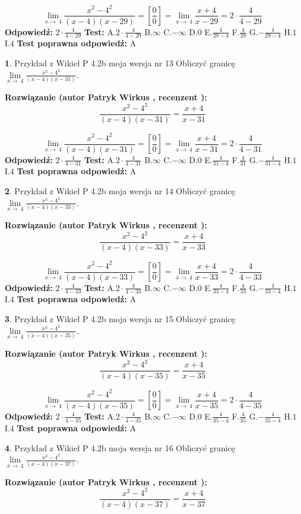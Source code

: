 \documentclass[12pt, a4paper]{article}
\theoremstyle{definition} %
\newtheorem{zad}{}
\newcommand{\zadStart}[1]{\begin{zad}#1\newline}
\newcommand{\zadStop}{\end{zad}}
\newcommand{\rozwStart}[2]{\noindent \textbf{Rozwiązanie (autor #1 , recenzent #2): }\newline}
\newcommand{\rozwStop}{\newline}
\newcommand{\odpStart}{\noindent \textbf{Odpowiedź:}\newline}
\newcommand{\odpStop}{\newline}
\newcommand{\testStart}{\noindent \textbf{Test:}\newline}
\newcommand{\testStop}{\newline}
\newcommand{\kluczStart}{\noindent \textbf{Test poprawna odpowiedź:}\newline}
\newcommand{\kluczStop}{\newline}
\begin{document}
$$\lim\limits_{x\to\ 4}\frac{x^{2}-4^{2}}{(x-4)(x-29)}=[\frac{0}{0}]=\lim\limits_{x\to\ 4}\frac{x+4}{x-29}=2 \cdot \frac{4}{4-29}$$
\rozwStop
\odpStart
$2 \cdot \frac{4}{4-29}$
\odpStop
\testStart
A.$2 \cdot \frac{4}{4-29}$
B.$\infty$
C.$-\infty$
D.$0$
E.$\frac{4}{29-4}$
F.$\frac{4}{29}$
G.$-\frac{4}{29-4}$
H.$1$
I.$4$
\testStop
\kluczStart
A
\kluczStop



\zadStart{Przykład z Wikieł P 4.2b moja wersja nr 13}
Obliczyć granicę $\lim\limits_{x\to\ 4}\frac{x^{2}-4^{2}}{(x-4)(x-31)}$.
\zadStop
\rozwStart{Patryk Wirkus}{}
$$\frac{x^{2}-4^{2}}{(x-4)(x-31)}=\frac{x+4}{x-31}$$

$$\lim\limits_{x\to\ 4}\frac{x^{2}-4^{2}}{(x-4)(x-31)}=[\frac{0}{0}]=\lim\limits_{x\to\ 4}\frac{x+4}{x-31}=2 \cdot \frac{4}{4-31}$$
\rozwStop
\odpStart
$2 \cdot \frac{4}{4-31}$
\odpStop
\testStart
A.$2 \cdot \frac{4}{4-31}$
B.$\infty$
C.$-\infty$
D.$0$
E.$\frac{4}{31-4}$
F.$\frac{4}{31}$
G.$-\frac{4}{31-4}$
H.$1$
I.$4$
\testStop
\kluczStart
A
\kluczStop



\zadStart{Przykład z Wikieł P 4.2b moja wersja nr 14}
Obliczyć granicę $\lim\limits_{x\to\ 4}\frac{x^{2}-4^{2}}{(x-4)(x-33)}$.
\zadStop
\rozwStart{Patryk Wirkus}{}
$$\frac{x^{2}-4^{2}}{(x-4)(x-33)}=\frac{x+4}{x-33}$$

$$\lim\limits_{x\to\ 4}\frac{x^{2}-4^{2}}{(x-4)(x-33)}=[\frac{0}{0}]=\lim\limits_{x\to\ 4}\frac{x+4}{x-33}=2 \cdot \frac{4}{4-33}$$
\rozwStop
\odpStart
$2 \cdot \frac{4}{4-33}$
\odpStop
\testStart
A.$2 \cdot \frac{4}{4-33}$
B.$\infty$
C.$-\infty$
D.$0$
E.$\frac{4}{33-4}$
F.$\frac{4}{33}$
G.$-\frac{4}{33-4}$
H.$1$
I.$4$
\testStop
\kluczStart
A
\kluczStop



\zadStart{Przykład z Wikieł P 4.2b moja wersja nr 15}
Obliczyć granicę $\lim\limits_{x\to\ 4}\frac{x^{2}-4^{2}}{(x-4)(x-35)}$.
\zadStop
\rozwStart{Patryk Wirkus}{}
$$\frac{x^{2}-4^{2}}{(x-4)(x-35)}=\frac{x+4}{x-35}$$

$$\lim\limits_{x\to\ 4}\frac{x^{2}-4^{2}}{(x-4)(x-35)}=[\frac{0}{0}]=\lim\limits_{x\to\ 4}\frac{x+4}{x-35}=2 \cdot \frac{4}{4-35}$$
\rozwStop
\odpStart
$2 \cdot \frac{4}{4-35}$
\odpStop
\testStart
A.$2 \cdot \frac{4}{4-35}$
B.$\infty$
C.$-\infty$
D.$0$
E.$\frac{4}{35-4}$
F.$\frac{4}{35}$
G.$-\frac{4}{35-4}$
H.$1$
I.$4$
\testStop
\kluczStart
A
\kluczStop



\zadStart{Przykład z Wikieł P 4.2b moja wersja nr 16}
Obliczyć granicę $\lim\limits_{x\to\ 4}\frac{x^{2}-4^{2}}{(x-4)(x-37)}$.
\zadStop
\rozwStart{Patryk Wirkus}{}
$$\frac{x^{2}-4^{2}}{(x-4)(x-37)}=\frac{x+4}{x-37}$$
\end{document}
